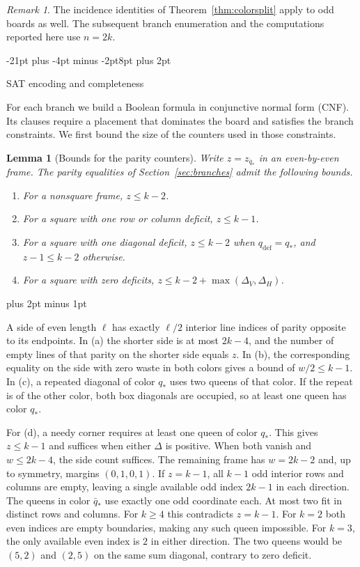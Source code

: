 \documentclass[11pt,a4paper]{article}
\makeatletter
\renewcommand{\section}{\@startsection{section}{1}{\z@}%
  {-21pt plus -4pt minus -2pt}{8pt plus 2pt}%
  {\normalfont\fontsize{14}{17}\selectfont\bfseries\raggedright}}
\renewenvironment{proof}[1][\proofname]{%
  \par\pushQED{\qed}\normalfont
  \topsep8pt plus 2pt minus 1pt\relax
  \trivlist\item[\hskip\labelsep\itshape #1\@addpunct{.}]\ignorespaces
}{\popQED\endtrivlist\@endpefalse}
\theoremstyle{result}
\newtheorem{lemma}[theorem]{Lemma}
\theoremstyle{definition}
\theoremstyle{remark}
\newtheorem{remark}[theorem]{Remark}
\makeatother
\begin{document}
\begin{remark}
The incidence identities of Theorem~\ref{thm:colorsplit} apply to odd
boards as well. The subsequent branch enumeration and the computations
reported here use $n=2k$.
\end{remark}

\section{SAT encoding and completeness}\label{sec:encoding}

For each branch we build a Boolean formula in conjunctive normal
form (CNF). Its clauses require a placement that dominates the
board and satisfies the branch constraints. We first bound the size
of the counters used in those constraints.

\begin{lemma}[Bounds for the parity counters]\label{lem:caps}
Write $z=z_{\bar q_*}$ in an even-by-even frame. The parity
equalities of Section~\ref{sec:branches} admit the following bounds.
\begin{enumerate}[label=(\alph*),leftmargin=2em,itemsep=2pt]
  \item For a nonsquare frame, $z\le k-2$.
  \item For a square with one row or column deficit, $z\le k-1$.
  \item For a square with one diagonal deficit, $z\le k-2$ when
    $q_{\mathrm{def}}=q_*$, and $z-1\le k-2$ otherwise.
  \item For a square with zero deficits,
    $z\le k-2+\max(\Delta_V,\Delta_H)$.
\end{enumerate}
\end{lemma}

\begin{proof}
A side of even length $\ell$ has exactly $\ell/2$ interior line
indices of parity opposite to its endpoints. In (a) the shorter
side is at most $2k-4$, and the number of empty lines of that parity
on the shorter side equals $z$. In (b), the corresponding equality
on the side with zero waste in both colors gives a bound of
$w/2\le k-1$. In (c), a repeated diagonal of color $q_*$ uses two
queens of that color. If the repeat is of the other color, both
box diagonals are occupied, so at least one queen has color $q_*$.

For (d), a needy corner requires at least one queen of color $q_*$.
This gives $z\le k-1$ and suffices when either $\Delta$ is positive.
When both vanish and $w\le 2k-4$, the side count suffices. The
remaining frame has $w=2k-2$ and, up to symmetry, margins
$(0,1,0,1)$. If $z=k-1$, all $k-1$ odd interior rows and columns
are empty, leaving a single available odd index $2k-1$ in each
direction. The queens in color $\bar q_*$ use exactly one odd
coordinate each. At most two fit in distinct rows and columns.
For $k\ge4$ this contradicts $z=k-1$. For $k=2$ both even indices
are empty boundaries, making any such queen impossible. For $k=3$,
the only available even index is $2$ in either direction. The two
queens would be $(5,2)$ and $(2,5)$ on the same sum diagonal,
contrary to zero deficit.
\end{proof}
\end{document}
